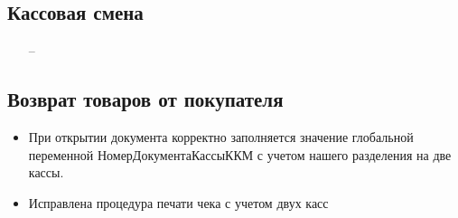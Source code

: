 \subsection{Кассовая смена}

\begin{itemize}
	\item [--]
\end{itemize}



\subsection{Возврат товаров от покупателя}
\begin{itemize}
	\item При открытии документа корректно заполняется значение глобальной переменной НомерДокументаКассыККМ
	 с учетом нашего разделения на две кассы.
\item Исправлена процедура печати чека с учетом двух касс

\end{itemize}


